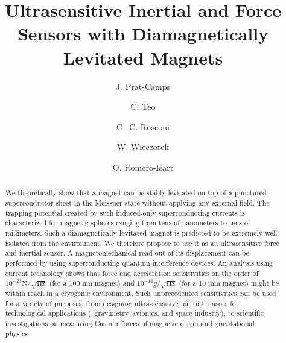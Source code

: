 \documentclass[twocolumn,superscriptaddress,floatfix,preprintnumbers,prl]{revtex4}
\begin{document}
\title{Ultrasensitive Inertial and Force Sensors with Diamagnetically Levitated Magnets}

\author{J. Prat-Camps}

\author{C. Teo}

\author{C.~C. Rusconi}

\author{W. Wieczorek}


\author{O. Romero-Isart}  

\begin{abstract}
We theoretically show that a magnet can be stably levitated on top of a punctured superconductor sheet in the Meissner state without applying any external field. The trapping potential  created by such induced-only superconducting currents is characterized for magnetic spheres ranging from tens of nanometers to tens of millimeters. Such a diamagnetically levitated magnet  is predicted to be extremely well isolated from the environment. We therefore propose to use it as an ultrasensitive force and inertial sensor. A magnetomechanical read-out of its displacement can be performed by using superconducting quantum interference devices. An analysis using current technology shows that force and acceleration sensitivities on the order of $10^{-23}\text{N}/\sqrt{\text{Hz}}$ (for a 100 nm magnet) and $10^{-14}g/\sqrt{\text{Hz}}$ (for a 10 mm magnet) might be within reach in a cryogenic environment.
Such unprecedented sensitivities can be used for a variety of purposes, from designing ultra-sensitive inertial sensors for technological applications (\eg~gravimetry, avionics, and space industry), to scientific investigations on measuring Casimir forces of magnetic origin and gravitational physics. 
\end{abstract}
\end{document}
